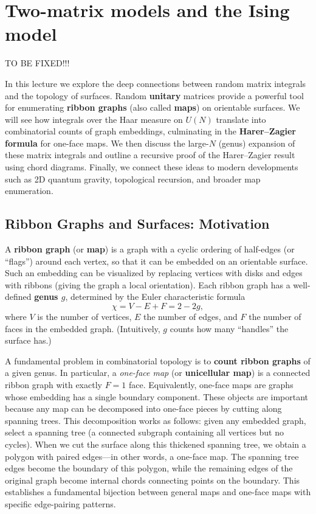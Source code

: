 \documentclass[letterpaper,11pt,oneside,reqno]{article}
\numberwithin{equation}{section}
\theoremstyle{definition}
\begin{document}
\section{Two-matrix models and the Ising model}



TO BE FIXED!!!


In this lecture we explore the deep connections between random matrix integrals and the topology of surfaces. Random \textbf{unitary} matrices provide a powerful tool for enumerating \textbf{ribbon graphs} (also called \textbf{maps}) on orientable surfaces. We will see how integrals over the Haar measure on $U(N)$ translate into combinatorial counts of graph embeddings, culminating in the \textbf{Harer–Zagier formula} for one-face maps. We then discuss the large-$N$ (genus) expansion of these matrix integrals and outline a recursive proof of the Harer–Zagier result using chord diagrams. Finally, we connect these ideas to modern developments such as 2D quantum gravity, topological recursion, and broader map enumeration.

\subsection*{Ribbon Graphs and Surfaces: Motivation}

A \textbf{ribbon graph} (or \textbf{map}) is a graph with a cyclic ordering of half-edges (or ``flags'') around each vertex, so that it can be embedded on an orientable surface. Such an embedding can be visualized by replacing vertices with disks and edges with ribbons (giving the graph a local orientation). Each ribbon graph has a well-defined \textbf{genus $g$}, determined by the Euler characteristic formula
\[ \chi = V - E + F = 2 - 2g, \]
where $V$ is the number of vertices, $E$ the number of edges, and $F$ the number of faces in the embedded graph. (Intuitively, $g$ counts how many ``handles'' the surface has.)

A fundamental problem in combinatorial topology is to \textbf{count ribbon graphs} of a given genus. In particular, a \emph{one-face map} (or \textbf{unicellular map}) is a connected ribbon graph with exactly $F=1$ face. Equivalently, one-face maps are graphs whose embedding has a single boundary component. These objects are important because any map can be decomposed into one-face pieces by cutting along spanning trees. This decomposition works as follows: given any embedded graph, select a spanning tree (a connected subgraph containing all vertices but no cycles). When we cut the surface along this thickened spanning tree, we obtain a polygon with paired edges—in other words, a one-face map. The spanning tree edges become the boundary of this polygon, while the remaining edges of the original graph become internal chords connecting points on the boundary. This establishes a fundamental bijection between general maps and one-face maps with specific edge-pairing patterns.
\end{document}
